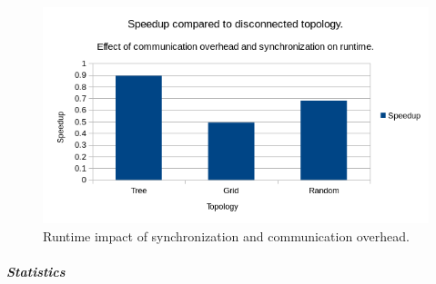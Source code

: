 \begin{figure}
    \centering
    \includegraphics[width=\textwidth,height=\textheight,keepaspectratio]{figures/usecasespeedup.png}
    \caption{Runtime impact of synchronization and communication overhead.}
    \label{fig:usecasespeedup}
\end{figure}
\subparagraph{Statistics}
